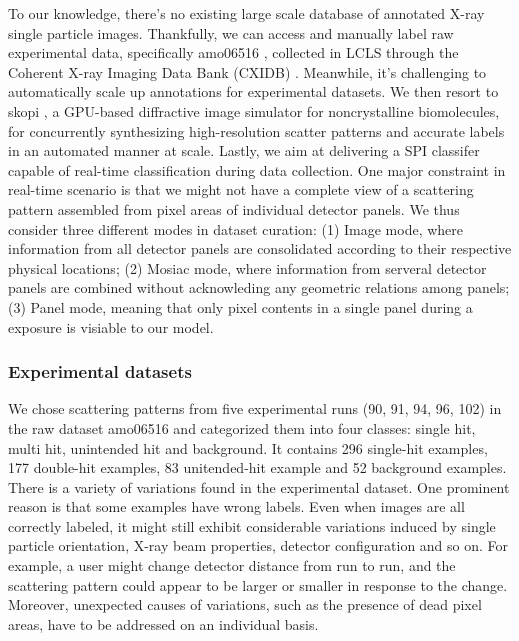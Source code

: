 To our knowledge, there's no existing large scale database of annotated X-ray
single particle images.  Thankfully, we can access and manually label raw
experimental data, specifically amo06516 \cite{liDiffractionDataAerosolized2020},
collected in LCLS through the Coherent X-ray Imaging Data Bank (CXIDB)
\cite{maiaCoherentXrayImaging2012}.  Meanwhile, it's challenging to
automatically scale up annotations for experimental datasets.  We then resort to
skopi \cite{peckSkopiSimulationPackage2021}, a GPU-based diffractive image
simulator for noncrystalline biomolecules, for concurrently synthesizing
high-resolution scatter patterns and accurate labels in an automated manner at
scale.  Lastly, we aim at delivering a SPI classifer capable of real-time
classification during data collection.  One major constraint in real-time
scenario is that we might not have a complete view of a scattering pattern
assembled from pixel areas of individual detector panels.  We thus consider
three different modes in dataset curation: (1) Image mode, where information
from all detector panels are consolidated according to their respective physical
locations; (2) Mosiac mode, where information from serveral detector panels are
combined without acknowleding any geometric relations among panels;  (3) Panel
mode, meaning that only pixel contents in a single panel during a exposure is
visiable to our model.  


\subsubsection{Experimental datasets}


We chose scattering patterns from five experimental runs (90, 91, 94, 96, 102)
in the raw dataset amo06516 and categorized them into four classes: single hit,
multi hit, unintended hit and background.  It contains 296 single-hit examples,
177 double-hit examples, 83 unitended-hit example and 52 background examples.
There is a variety of variations found in the experimental dataset.  One
prominent reason is that some examples have wrong labels. Even when images are
all correctly labeled, it might still exhibit considerable variations induced by
single particle orientation, X-ray beam properties, detector configuration and
so on.  For example, a user might change detector distance from run to run, and
the scattering pattern could appear to be larger or smaller in response to the
change. Moreover, unexpected causes of variations, such as the presence of dead
pixel areas, have to be addressed on an individual basis.  



